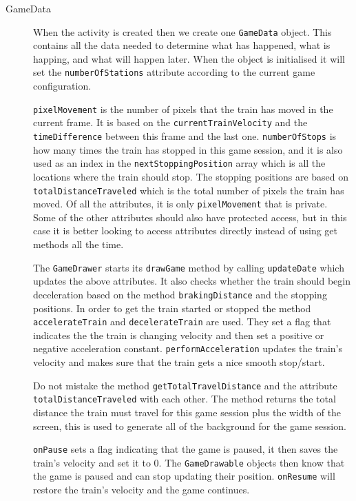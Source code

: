 \begin{description}
\item[GameData] When the activity is created then we create one \lstinline|GameData| object. This contains all the data needed to determine what has happened, what is happing, and what will happen later. When the object is initialised it will set the \lstinline|numberOfStations| attribute according to the current game configuration.

\lstinline|pixelMovement| is the number of pixels that the train has moved in the current frame. It is based on the \lstinline|currentTrainVelocity| and the \lstinline|timeDifference| between this frame and the last one. \lstinline|numberOfStops| is how many times the train has stopped in this game session, and it is also used as an index in the \lstinline|nextStoppingPosition| array which is all the locations where the train should stop. The stopping positions are based on \lstinline|totalDistanceTraveled| which is the total number of pixels the train has moved. Of all the attributes, it is only \lstinline|pixelMovement| that is private. Some of the other attributes should also have protected access, but in this case it is better looking to access attributes directly instead of using get methods all the time.

The \lstinline|GameDrawer| starts its \lstinline|drawGame| method by calling \lstinline|updateDate| which updates the above attributes. It also checks whether the train should begin deceleration based on the method \lstinline|brakingDistance| and the stopping positions. In order to get the train started or stopped the method \lstinline|accelerateTrain| and \lstinline|decelerateTrain| are used. They set a flag that indicates the the train is changing velocity and then set a positive or negative acceleration constant. \lstinline|performAcceleration| updates the train's velocity and makes sure that the train gets a nice smooth stop/start.

Do not mistake the method \lstinline|getTotalTravelDistance| and the attribute \lstinline|totalDistanceTraveled| with each other. The method returns the total distance the train must travel for this game session plus the width of the screen, this is used to generate all of the background for the game session.

\lstinline|onPause| sets a flag indicating that the game is paused, it then saves the train's velocity and set it to 0. The \lstinline|GameDrawable| objects then know that the game is paused and can stop updating their position. \lstinline|onResume| will restore the train's velocity and the game continues.
\end{description}
